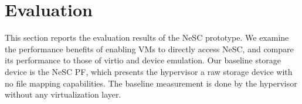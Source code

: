 \section{Evaluation}
\label{sec:eval}










This section reports the evaluation results of the NeSC prototype.
We examine the performance benefits of enabling VMs to directly access NeSC, and compare its performance to those of virtio and device emulation.
Our baseline storage device is the NeSC PF, which presents the hypervisor a raw storage device with no file mapping capabilities. The baseline measurement is done by the hypervisor without any virtualization layer.

